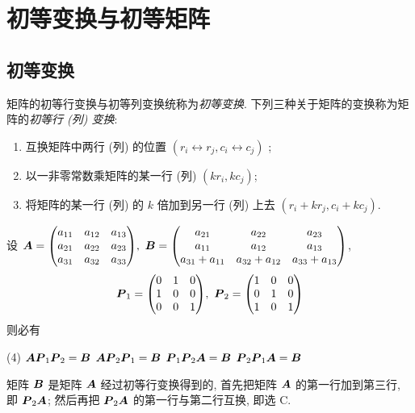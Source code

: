 \section{初等变换与初等矩阵}

\subsection{初等变换}

\begin{definition}[矩阵的初等变换]
    矩阵的初等行变换与初等列变换统称为\textit{初等变换}. 下列三种关于矩阵的变换称为矩阵的\textit{初等行 (列) 变换}:
    \begin{enumerate}[label=(\arabic{*})]
        \item 互换矩阵中两行 (列) 的位置 $ \left(r_{i} \leftrightarrow r_{j}, c_{i} \leftrightarrow c_{j}\right)$ ;
        \item 以一非零常数乘矩阵的某一行 (列) $ \left(k r_{i}, k c_{j}\right) $;
        \item 将矩阵的某一行 (列) 的 $ k $ 倍加到另一行 (列) 上去 $ \left(r_{i}+k r_{j}, c_{i}+k c_{j}\right) $.
    \end{enumerate}
\end{definition}

\begin{example}
    设 $\vb*{A}=\mqty(\xmat*{a}{3}{3}),~\vb*{B}=\mqty(a_{21}&a_{22}&a_{23}\\a_{11}&a_{12}&a_{13}\\a_{31}+a_{11}&a_{32}+a_{12}&a_{33}+a_{13})$, 
    $$\vb*{P}_1=\mqty(0&1&0\\1&0&0\\0&0&1),~\vb*{P}_2=\mqty(1&0&0\\0&1&0\\1&0&1)$$
    则必有
    \begin{tasks}(4)
        \task $\vb*{AP}_1\vb*{P}_2=\vb*{B}$
        \task $\vb*{AP}_2\vb*{P}_1=\vb*{B}$
        \task $\vb*{P}_1\vb*{P}_2\vb*{A}=\vb*{B}$
        \task $\vb*{P}_2\vb*{P}_1\vb*{A}=\vb*{B}$
    \end{tasks}
\end{example}
\begin{solution}
    矩阵 $\vb*{B}$ 是矩阵 $\vb*{A}$ 经过初等行变换得到的, 首先把矩阵 $\vb*{A}$ 的第一行加到第三行, 即 $\vb*{P}_2\vb*{A}$;
    然后再把 $\vb*{P}_2\vb*{A}$ 的第一行与第二行互换, 即选 C.
\end{solution}

